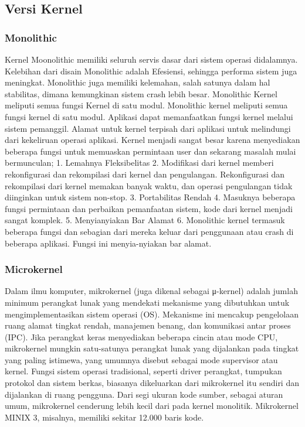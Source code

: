 		\subsection{Versi Kernel}
			\subsubsection{Monolithic}
			 Kernel Moonolithic memiliki seluruh servis dasar dari sistem operasi didalamnya. Kelebihan dari disain Monolithic adalah Efesiensi, sehingga performa sistem juga
			 meningkat. Monolithic juga memiliki kelemahan, salah satunya dalam hal stabilitas, dimana kemungkinan sistem crash lebih besar. Monolithic Kernel meliputi semua 
			 fungsi Kernel di satu modul. Monolithic kernel meliputi semua fungsi kernel di satu modul. Aplikasi dapat memanfaatkan fungsi kernel melalui sistem pemanggil. Alamat untuk kernel terpisah dari aplikasi untuk melindungi dari kekeliruan operasi aplikasi. Kernel menjadi sangat besar karena menyediakan beberapa fungsi untuk memuaskan permintaan user dan sekarang masalah mulai bermunculan;
			 1. Lemahnya Fleksibelitas
			 2. Modifikasi dari kernel memberi rekonfigurasi dan rekompilasi dari kernel dan pengulangan. Rekonfigurasi dan rekompilasi dari kernel memakan banyak waktu, dan operasi pengulangan tidak diinginkan untuk sistem non-stop.  
			 3. Portabilitas Rendah
			 4. Masuknya beberapa fungsi permintaan dan perbaikan pemanfaatan sistem, kode dari kernel menjadi sangat komplek.
			 5. Menyianyiakan Bar Alamat
			 6. Monolithic kernel termasuk beberapa fungsi dan sebagian dari mereka keluar dari penggunaan atau crash di beberapa aplikasi. Fungsi ini menyia-nyiakan bar alamat.
	
			\subsubsection{Microkernel}
			 Dalam ilmu komputer, mikrokernel (juga dikenal sebagai μ-kernel) adalah jumlah minimum perangkat lunak yang mendekati mekanisme yang dibutuhkan untuk mengimplementasikan sistem operasi (OS). Mekanisme ini mencakup pengelolaan ruang alamat tingkat rendah, manajemen benang, dan komunikasi antar proses (IPC).
			 Jika perangkat keras menyediakan beberapa cincin atau mode CPU, mikrokernel mungkin satu-satunya perangkat lunak yang dijalankan pada tingkat yang paling istimewa, yang umumnya disebut sebagai mode supervisor atau kernel. Fungsi sistem operasi tradisional, seperti driver perangkat, tumpukan protokol dan sistem berkas, biasanya dikeluarkan dari mikrokernel itu sendiri dan dijalankan di ruang pengguna.
			 Dari segi ukuran kode sumber, sebagai aturan umum, mikrokernel cenderung lebih kecil dari pada kernel monolitik. Mikrokernel MINIX 3, misalnya, memiliki sekitar 12.000 baris kode.

